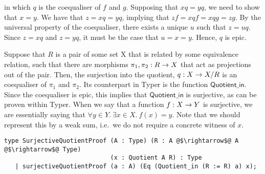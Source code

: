 \documentclass[12pt,twoside,maitrise]{dms}
\theoremstyle{definition}
\numberwithin{equation}{section}
\numberwithin{table}{chapter}
\numberwithin{figure}{chapter}
\newcommand\kw[1] {\textsf{#1}}
\begin{document}
\begin{figure}[H]
\end{figure}

in which $q$ is the coequaliser of $f$ and $g$. Supposing that $xq = yq$, we need to show that $x = y$. We have that $z = xq = yq$, implying that $zf = xqf = xqg = zg$. By the universal property of the coequaliser, there exists a unique $u$ such that $z = uq$. Since $z = xq$ and $z = yq$, it must be the case that $u = x = y$. Hence, $q$ is epic.

Suppose that $R$ is a pair of some set X that is related by some equivalence
relation, such that there are morphisms $\oftype{\pi_1, \pi_2}{R \rightarrow X}$
that act as projections out of the pair. Then, the surjection into the quotient,
$\oftype{q}{X \rightarrow X/R}$ is an coequaliser of $\pi_1$ and $\pi_2$. Its
counterpart in Typer is the function $\kw{Quotient\_in}$. Since the coequaliser
is epic, this implies that $\kw{Quotient\_in}$ is surjective, as can be proven
within Typer. When we say that a function $\oftype{f}{X \rightarrow Y}$ is
surjective, we are essentially saying that $\forall y \in Y. \ \exists x \in X.
\ f(x) = y$. Note that we should represent this by a weak sum, i.e.\ we do not
require a concrete witness of $x$.

\begin{verbatim}
type SurjectiveQuotientProof (A : Type) (R : A @$\rightarrow$@ A @$\rightarrow$@ Type)
                             (x : Quotient A R) : Type
   | surjectiveQuotientProof (a : A) (Eq (Quotient_in (R := R) a) x);
\end{verbatim}
\end{document}

